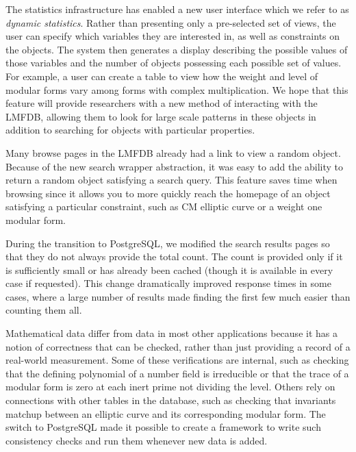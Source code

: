 \documentclass{amsart}
\begin{document}
The statistics infrastructure has enabled a new user interface which we refer to as \emph{dynamic statistics}.
Rather than presenting only a pre-selected set of views, the user can specify which variables they are interested in, as well as constraints on the objects.
The system then generates a display describing the possible values of those variables and the number of objects possessing each possible set of values.
For example, a user can create a table to view how the weight and level of modular forms vary among forms with complex multiplication.
We hope that this feature will provide researchers with a new method of interacting with the LMFDB, allowing them to look for large scale patterns in these objects in addition to searching for objects with particular properties.

Many browse pages in the LMFDB already had a link to view a random object.
Because of the new search wrapper abstraction, it was easy to add the ability to return a random object satisfying a search query.
This feature saves time when browsing since it allows you to more quickly reach the homepage of an object satisfying a particular constraint, such as CM elliptic curve or a weight one modular form.

During the transition to PostgreSQL, we modified the search results pages so that they do not always provide the total count.
The count is provided only if it is sufficiently small or has already been cached (though it is available in every case if requested).
This change dramatically improved response times in some cases, where a large number of results made finding the first few much easier than counting them all.

Mathematical data differ from data in most other applications because it has a notion of correctness that can be checked, rather than just providing a record of a real-world measurement.
Some of these verifications are internal, such as checking that the defining polynomial of a number field is irreducible or that the trace of a modular form is zero at each inert prime not dividing the level.
Others rely on connections with other tables in the database, such as checking that invariants matchup between an elliptic curve and its corresponding modular form.
The switch to PostgreSQL made it possible to create a framework to write such consistency checks and run them whenever new data is added.


\end{document}
